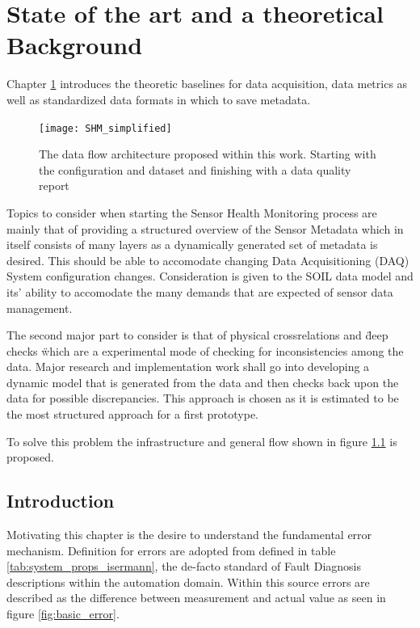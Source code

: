 

\chapter{State of the art and a theoretical Background}
\label{chap:2}

Chapter \ref{chap:2} introduces the theoretic baselines for data acquisition, data metrics as well as standardized data formats in which to save metadata.

\begin{figure}
    \centering
    \texttt{[image: SHM\_simplified]}
    \caption{The data flow architecture proposed within this work. Starting with the configuration and dataset and finishing with a data quality report}
    \label{fig:SHM_simplified}
\end{figure}
Topics to consider when starting the Sensor Health Monitoring process are mainly that of providing a structured overview of the Sensor Metadata which in itself consists of many layers as a dynamically generated set of metadata is desired. This should be able to accomodate changing Data Acquisitioning (DAQ) System configuration changes. Consideration is given to the SOIL data model and its' ability to accomodate the many demands that are expected of sensor data management. \cite{behrens_domain-specific_2021}


The second major part to consider is that of physical crossrelations and \" deep checks \" which are a experimental mode of checking for inconsistencies among the data. Major research and implementation work shall go into developing a dynamic model that is generated from the data and then checks back upon the data for possible discrepancies. This approach is chosen as it is estimated to be the most structured approach for a first prototype.



To solve this problem the infrastructure and general flow shown in figure \ref{fig:SHM_simplified} is proposed.



\section{Introduction}

Motivating this chapter is the desire to understand the fundamental error mechanism. Definition for errors are adopted from \textcite{isermann_fault-diagnosis_2006} defined in table \ref{tab:system_props_isermann}, the de-facto standard of Fault Diagnosis descriptions within the automation domain. Within this source errors are described as the difference between measurement and actual value as seen in figure \ref{fig:basic_error}.

